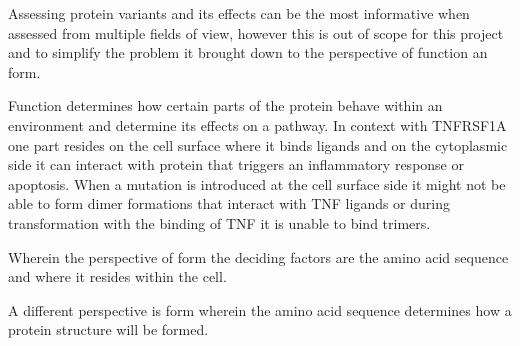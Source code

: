 	Assessing protein variants and its effects can be the most informative when assessed from multiple fields of view, however this is out of scope for this project and to simplify the problem it brought down to the perspective of function an form.
	
	Function determines how certain parts of the protein behave within an environment and determine its effects on a pathway. In context with TNFRSF1A one part resides on the cell surface where it binds ligands and on the cytoplasmic side it can interact with protein that triggers an inflammatory response or apoptosis. When a mutation is introduced at the cell surface side it might not be able to form dimer formations that interact with TNF ligands or during transformation with the binding of TNF it is unable to bind trimers. 
	
	Wherein the perspective of form the deciding factors are the amino acid sequence and where it resides within the cell.
	
	A different perspective is form wherein the amino acid sequence determines how a protein structure will be formed.
	
%	
%	
%	
%	
%	
%	
	
